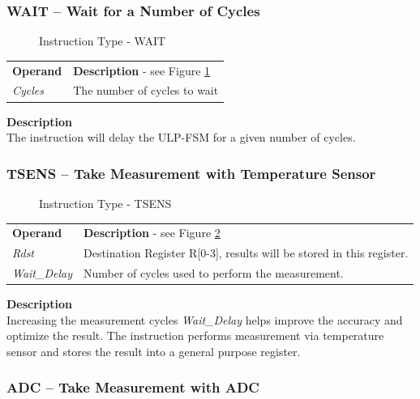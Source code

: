 \documentclass[main\_\_EN.tex]{subfiles}
\begin{document}
\subsubsection{WAIT – Wait for a Number of Cycles}

%
%
%
\begin{figure}[!ht ]
    \centering
    \caption{Instruction Type - WAIT}
    \label{figure:WAIT}
\end{figure}

\begin{tabular}{ l l }
\textbf{Operand} & \textbf{Description} - see Figure \ref{figure:WAIT} \\
\textit{Cycles} & The number of cycles to wait
\end{tabular}

\textbf{Description} \\
The instruction will delay the ULP-FSM for a given number of cycles.

\subsubsection{TSENS – Take Measurement with Temperature Sensor}


%
%
%
%
\begin{figure}[!ht ]
    \centering
    \caption{Instruction Type - TSENS}
    \label{figure:TSENS}
\end{figure}

\begin{tabular}{ l l }
\textbf{Operand} & \textbf{Description} - see Figure \ref{figure:TSENS} \\
\textit{Rdst} & Destination Register R[0-3], results will be stored in this register.\\
\textit{Wait\_Delay} & Number of cycles used to perform the measurement.
\end{tabular}


\textbf{Description} \\
Increasing the measurement cycles \textit{Wait\_Delay} helps improve the accuracy and optimize the result. The instruction performs measurement via temperature sensor and stores the result into a general purpose register.


\subsubsection{ADC – Take Measurement with ADC} \label{subsection:ADC}
\end{document}
